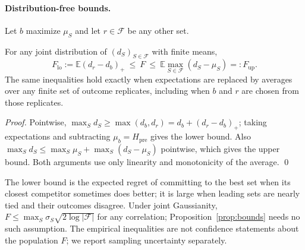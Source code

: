 \documentclass[runningheads]{llncs}
\newcommand{\Hpre}{H_{\mathrm{pre}}}
\begin{document}
\paragraph{Distribution-free bounds.} Let $b$ maximize $\mu_S$ and let $r\in\mathcal F$ be any other set.
\begin{proposition}\label{prop:bounds}
For any joint distribution of $(d_S)_{S\in\mathcal F}$ with finite means,
\begin{equation}
 F_{\mathrm{lo}}:=\mathbb E(d_r-d_b)_+\ \le\ F\ \le\ \mathbb E\max_{S\in\mathcal F}(d_S-\mu_S)=:F_{\mathrm{up}} .\label{eq:bounds}
\end{equation}
The same inequalities hold exactly when expectations are replaced by averages over any finite set of outcome replicates, including when $b$ and $r$ are chosen from those replicates.
\end{proposition}
\begin{proof}
Pointwise, $\max_S d_S\ge\max(d_b,d_r)=d_b+(d_r-d_b)_+$; taking expectations and subtracting $\mu_b=\Hpre$ gives the lower bound. Also $\max_S d_S\le\max_S\mu_S+\max_S(d_S-\mu_S)$ pointwise, which gives the upper bound. Both arguments use only linearity and monotonicity of the average. \qed
\end{proof}
The lower bound is the expected regret of committing to the best set when its closest competitor sometimes does better; it is large when leading sets are nearly tied and their outcomes disagree. Under joint Gaussianity, $F\le\max_S\sigma_S\sqrt{2\log|\mathcal F|}$ for any correlation; Proposition~\ref{prop:bounds} needs no such assumption. The empirical inequalities are not confidence statements about the population $F$; we report sampling uncertainty separately.
\end{document}
